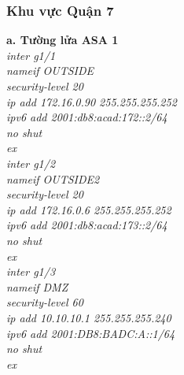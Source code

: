 \documentclass[a4paper, 12pt]{article}
\begin{document}
\subsubsection{Khu vực Quận 7 }
\hspace*{1cm}\textbf{a. Tường lửa ASA 1}\\
\hspace*{2cm}\textit{inter g1/1\\
\hspace*{2cm}nameif OUTSIDE\\
\hspace*{2cm}security-level 20\\
\hspace*{2cm}ip add 172.16.0.90 255.255.255.252\\
\hspace*{2cm}ipv6 add 2001:db8:acad:172::2/64\\
\hspace*{2cm}no shut \\
\hspace*{2cm}ex\\
\hspace*{2cm}inter g1/2\\
\hspace*{2cm}nameif OUTSIDE2\\
\hspace*{2cm}security-level 20\\
\hspace*{2cm}ip add 172.16.0.6 255.255.255.252\\
\hspace*{2cm}ipv6 add 2001:db8:acad:173::2/64\\
\hspace*{2cm}no shut \\
\hspace*{2cm}ex\\
\hspace*{2cm}inter g1/3\\
\hspace*{2cm}nameif DMZ\\
\hspace*{2cm}security-level 60\\
\hspace*{2cm}ip add 10.10.10.1 255.255.255.240\\
\hspace*{2cm}ipv6 add 2001:DB8:BADC:A::1/64\\
\hspace*{2cm}no shut\\
\hspace*{2cm}ex\\
}
\end{document}
